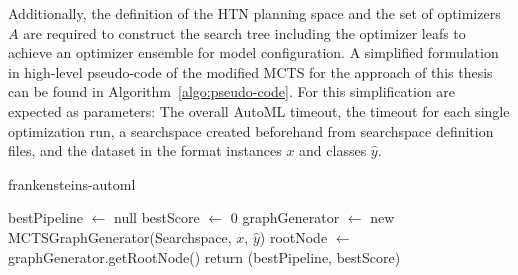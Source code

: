 Additionally, the definition of the HTN planning space and the set of optimizers $A$ are required to construct the search tree including the optimizer leafs to achieve an optimizer ensemble for model configuration.
A simplified formulation in high-level pseudo-code of the modified MCTS for the approach of this thesis can be found in Algorithm~\ref{algo:pseudo-code}.
For this simplification are expected as parameters: The overall AutoML timeout, the timeout for each single optimization run, a searchspace created beforehand from searchspace definition files, and the dataset in the format instances $x$ and classes $\hat{y}$.
\begin{algorithm}[H]
    \caption{frankensteins-automl}
    \label{algo:pseudo-code}
    \SetAlgoLined
    \DontPrintSemicolon
    \BlankLine
    bestPipeline $\leftarrow$ null\;
    bestScore $\leftarrow$ 0\;
    graphGenerator $\leftarrow$ new MCTSGraphGenerator(Searchspace, $x$, $\hat{y}$)\;
    rootNode $\leftarrow$ graphGenerator.getRootNode()\;
    return (bestPipeline, bestScore)\;
\end{algorithm}

